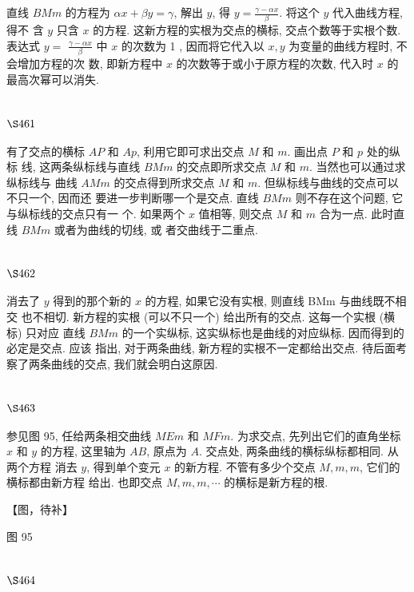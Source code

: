 直线 $B M m$ 的方程为 $\alpha x+\beta y=\gamma$, 解出 $y$, 得 $y=\frac{\gamma-\alpha x}{\beta}$. 将这个 $y$ 代入曲线方程, 得不 含 $y$ 只含 $x$ 的方程. 这新方程的实根为交点的横标, 交点个数等于实根个数. 表达式 $y=$ $\frac{\gamma-\alpha x}{\beta}$ 中 $x$ 的次数为 1 , 因而将它代入以 $x, y$ 为变量的曲线方程时, 不会增加方程的次 数, 即新方程中 $x$ 的次数等于或小于原方程的次数, 代入时 $x$ 的最高次幂可以消失.

\section{$\S 461$}

有了交点的横标 $A P$ 和 $A p$, 利用它即可求出交点 $M$ 和 $m$. 画出点 $P$ 和 $p$ 处的纵标 线, 这两条纵标线与直线 $B M m$ 的交点即所求交点 $M$ 和 $m$. 当然也可以通过求纵标线与 曲线 $A M m$ 的交点得到所求交点 $M$ 和 $m$. 但纵标线与曲线的交点可以不只一个, 因而还 要进一步判断哪一个是交点. 直线 $B M m$ 则不存在这个问题, 它与纵标线的交点只有一 个. 如果两个 $x$ 值相等, 则交点 $M$ 和 $m$ 合为一点. 此时直线 $B M m$ 或者为曲线的切线, 或 者交曲线于二重点.

\section{$\S 462$}

消去了 $y$ 得到的那个新的 $x$ 的方程, 如果它没有实根, 则直线 BMm 与曲线既不相交 也不相切. 新方程的实根 (可以不只一个) 给出所有的交点. 这每一个实根 (横标) 只对应 直线 $B M m$ 的一个实纵标, 这实纵标也是曲线的对应纵标. 因而得到的必定是交点. 应该 指出, 对于两条曲线, 新方程的实根不一定都给出交点. 待后面考察了两条曲线的交点, 我们就会明白这原因.

\section{$\S 463$}
参见图 95, 任给两条相交曲线 $M E m$ 和 $M F m$. 为求交点, 先列出它们的直角坐标 $x$ 和 $y$ 的方程, 这里轴为 $A B$, 原点为 $A$. 交点处, 两条曲线的横标纵标都相同. 从两个方程 消去 $y$, 得到单个变元 $x$ 的新方程. 不管有多少个交点 $M, m, m$, 它们的横标都由新方程 给出. 也即交点 $M, m, m, \cdots$ 的横标是新方程的根. 


【图，待补】

图 95

\section{$\S 464$}

